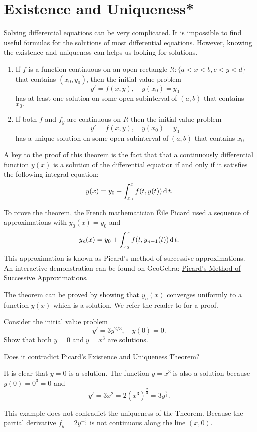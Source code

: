 \section{Existence and Uniqueness*}

Solving differential equations can be very complicated. It is impossible to find useful formulas for the solutions of most differential equations. However, knowing the existence and uniqueness can helps us looking for solutions.

\begin{theorem}
\begin{enumerate}
  \item 
  If $f$ is a function continuous on an open rectangle $R: \{a < x < b, c < y < d \}$
  that contains $(x_0,y_0)$, then the initial value problem
  \[y'=f(x,y), \quad y(x_0)=y_0\]
  has at least one solution on some open subinterval of $(a,b)$ that contains $x_0.$
  \item If both $f$ and $f_y$ are continuous on $R$ then the initial value problem
  \[y'=f(x,y), \quad y(x_0)=y_0\]
  has a unique solution on some open subinterval of $(a,b)$ that contains $x_0$
\end{enumerate}
\end{theorem}

A key to the proof of this theorem is the fact that that a continuously differential function $y(x)$ is a solution of the differential equation if and only if it satisfies the following integral equation:
  \[y(x)=y_0+\int_{x_0}^xf(t, y(t))\operatorname{d} t.\]

To prove the theorem, the French mathematician \'{E}ile Picard used a sequence of approximations with $y_0(x)=y_0$ and
\[y_{n}(x)=y_0+\int_{x_0}^xf(t, y_{n-1}(t))\operatorname{d} t.\]
This approximation is known as Picard's method of successive approximations. An interactive demonstration can be found on GeoGebra: \href{https://www.geogebra.org/m/jtnkbu72}{Picard's Method of Successive Approximations}.

The theorem can be proved by showing that $y_n(x)$ converges uniformly to a function $y(x)$ which is a solution. We refer the reader to \autocite[Chapter 13]{Simmons2016} for a proof.

\begin{example}
  Consider the initial value problem
\[y' = 3y^{2/3}, \quad y(0) = 0.\]
Show that both $y=0$ and $y=x^3$ are solutions.

Does it contradict Picard's Existence and Uniqueness Theorem?
\end{example}
\begin{solution}
  It is clear that $y=0$ is a solution. The function $y=x^3$ is also a solution because $y(0)=0^3=0$ and 
  \[y'=3x^2=2(x^3)^{\frac23}=3y^{\frac23}.\]

  This example does not contradict the uniqueness of the Theorem. Because the partial derivative $f_y=2y^{-\frac13}$ is not continuous along the line $(x,0)$.
\end{solution}

